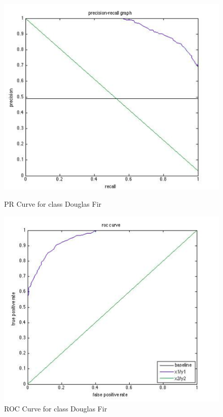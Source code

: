 \documentclass[11pt]{article}
\begin{document}
\begin{figure}[htbp]
\begin{minipage}[b]{0.5\linewidth}
\centering
\includegraphics[width=\linewidth]{DouglasFirPRCurve.png}
\caption{PR Curve for class Douglas Fir}
\label{fig:chapter001_dist_001}
\end{minipage}
\hspace{0.5cm}
\begin{minipage}[b]{0.5\linewidth}
\centering
\includegraphics[width=\linewidth]{DouglasFirROCCurve.png}
\caption{ROC Curve for class Douglas Fir}
\label{fig:chapter001_reward_001}
\end{minipage}
\end{figure}
\end{document}
